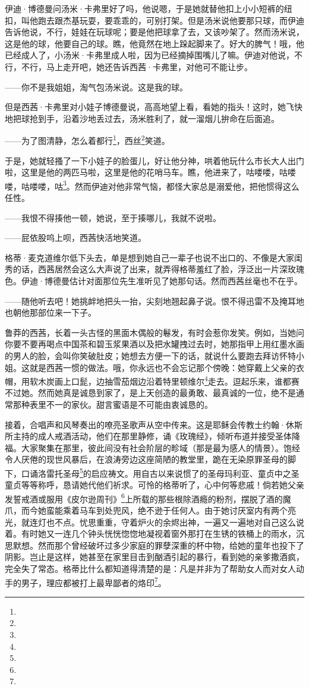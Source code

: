 \par 伊迪·博德曼问汤米·卡弗里好了吗，他说嗯，于是她就替他扣上小小短裤的纽扣，叫他跑去跟杰基玩耍，要乖乖的，可别打架。但是汤米说他要那只球，而伊迪告诉他说，不行，娃娃在玩球呢；要是他把球拿了去，又该吵架了。然而汤米说，这是他的球，他要自己的球。瞧，他竟然在地上跺起脚来了。好大的脾气！哦，他已经成人了，小汤米·卡弗里成人啦，因为已经摘掉围嘴儿了嘛。伊迪对他说，不行，不行，马上走开吧，她还告诉西茜·卡弗里，对他可不能让步。
\par ——你不是我姐姐，淘气包汤米说。这是我的球。
\par 但是西茜·卡弗里对小娃子博德曼说，高高地望上看，看她的指头！这时，她飞快地把球抢到手，沿着沙地丢过去，汤米胜利了，就一溜烟儿拚命在后面追。
\par ——为了图清静，怎么着都行\footnote{}，西丝\footnote{}笑道。
\par 于是，她就轻搔了一下小娃子的脸蛋儿，好让他分神，哄着他玩什么市长大人出门啦，这里是他的两匹马啦，这里是他的花哨马车。瞧，他进来了，咕喽喽，咕喽喽，咕喽喽，咕\footnote{}。然而伊迪对他非常气恼，都怪大家总是溺爱他，把他惯得这么任性。
\par ——我恨不得揍他一顿，她说，至于揍哪儿，我就不说啦。
\par ——屁依股呜上呗，西茜快活地笑道。
\par 格蒂·麦克道维尔低下头去，单是想到她自己一辈子也说不出口的、不像是大家闺秀的话，西茜居然会这么大声说了出来，就弄得格蒂羞红了脸，浮泛出一片深玫瑰色。伊迪·博德曼估计对面那位先生准听见了她那句话。然而西茜丝毫也不在乎。
\par ——随他听去吧！她挑衅地把头一抬，尖刻地翘起鼻子说。恨不得迅雷不及掩耳地也朝他那部位来一下子。
\par 鲁莽的西茜，长着一头古怪的黑面木偶般的鬈发，有时会惹你发笑。例如，当她问你要不要再喝点中国茶和碧玉浆果酒以及把水罐拽过去时，她那指甲上用红墨水画的男人的脸，会叫你笑破肚皮；她想去方便一下的话，就说什么要跑去拜访怀特小姐。这就是西茜一惯的做法。哦，你永远也不会忘记那个傍晚：她穿戴上父亲的衣帽，用软木炭画上口髭，边抽雪茄烟边沿着特里顿维尔\footnote{}走去。逗起乐来，谁都赛不过她。然而她真是诚恳到家了，是上天创造的最勇敢、最真诚的一位，绝不是通常那种表里不一的家伙。甜言蜜语是不可能由衷诚恳的。
\par 接着，合唱声和风琴奏出的嘹亮圣歌声从空中传来。这是耶稣会传教士约翰·休斯所主持的成人戒酒活动，他们在那里静修，诵《玫瑰经》，倾听布道并接受圣体降福。大家聚集在那里，彼此间没有社会阶层的畛域（那是最为感人的情景）。饱经令人厌倦的现世风暴后，在浪涛旁边这座简陋的教堂里，跪在无染原罪圣母的脚下，口诵洛雷托圣母\footnote{}的启应祷文。用自古以来说惯了的圣母玛利亚、童贞中之圣童贞等等称呼，恳请她代他们祈求。可怜的格蒂听了，心中何等悲戚！倘若她父亲发誓戒酒或服用《皮尔逊周刊》\footnote{}上所载的那些根除酒瘾的粉剂，摆脱了酒的魔爪，而今她蛮能乘着马车到处兜风，绝不逊于任何人。由于她讨厌室内有两个亮光，就连灯也不点。忧思重重，守着炉火的余烬出神，一遍又一遍地对自己这么说着。有时她又一连几个钟头恍恍惚惚地凝视着窗外那打在生锈的铁桶上的雨水，沉思默想。然而那个曾经破坏过多少家庭的罪孽深重的杯中物，给她的童年也投下了阴影。岂止是这样，她甚至在家里目击到酗酒引起的暴行，看到她的亲爹撒酒疯，完全失了常态。格蒂比什么都知道得清楚的是：凡是并非为了帮助女人而对女人动手的男子，理应都被打上最卑鄙者的烙印\footnote{}。
